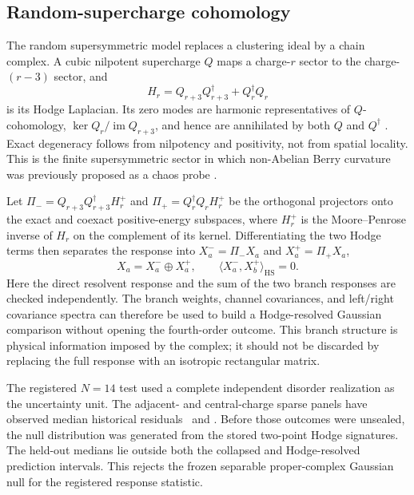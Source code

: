 \subsection{Random-supercharge cohomology}

The random supersymmetric model replaces a clustering ideal by a chain
complex.  A cubic nilpotent supercharge $Q$ maps a charge-$r$ sector to the
charge-$(r-3)$ sector, and
\begin{equation}
 H_r=Q_{r+3}Q_{r+3}^{\dagger}+Q_r^{\dagger}Q_r
 \label{eq:syk-hodge-laplacian}
\end{equation}
is its Hodge Laplacian.  Its zero modes are harmonic representatives of
$Q$-cohomology, $\ker Q_r/\operatorname{im}Q_{r+3}$, and hence are annihilated
by both $Q$ and $Q^\dagger$ \cite{fu2017susy}.  Exact degeneracy follows from
nilpotency and positivity, not from spatial locality.  This is the finite
supersymmetric sector in which non-Abelian Berry curvature was previously
proposed as a chaos probe \cite{chen2026}.

Let $\Pi_-=Q_{r+3}Q_{r+3}^{\dagger}H_r^+$ and
$\Pi_+=Q_r^{\dagger}Q_rH_r^+$ be the orthogonal projectors onto the exact and
coexact positive-energy subspaces, where $H_r^+$ is the Moore--Penrose inverse
of $H_r$ on the complement of its kernel.  Differentiating the two Hodge terms
then separates the response into $X_a^-=\Pi_-X_a$ and
$X_a^+=\Pi_+X_a$,
\begin{equation}
 X_a=X_a^{-}\oplus X_a^{+},
 \qquad
 \langle X_a^{-},X_b^{+}\rangle_{\mathrm{HS}}=0.
 \label{eq:hodge-response-split}
\end{equation}
Here the direct resolvent response and the sum of the two branch responses
are checked independently.  The branch weights, channel covariances, and
left/right covariance spectra can therefore be used to build a
Hodge-resolved Gaussian comparison without opening the fourth-order outcome.
This branch structure is physical information imposed by the complex; it
should not be discarded by replacing the full response with an isotropic
rectangular matrix.

The registered $N=14$ test used a complete independent disorder realization
as the uncertainty unit.  The adjacent- and central-charge sparse panels have
observed median historical residuals
\SusySykNFourteenMedianOne\ and
\SusySykNFourteenMedianTwo.  Before those outcomes were unsealed, the null
distribution was generated from the stored two-point Hodge signatures.  The
held-out medians lie outside both the collapsed and Hodge-resolved prediction
intervals.  This rejects the frozen separable proper-complex Gaussian null
for the registered response statistic.

